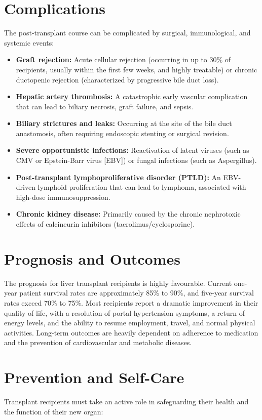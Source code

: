 \section*{Complications}
The post-transplant course can be complicated by surgical, immunological, and systemic events:

\begin{itemize}
    \item \textbf{Graft rejection:} Acute cellular rejection (occurring in up to 30\% of recipients, usually within the first few weeks, and highly treatable) or chronic ductopenic rejection (characterized by progressive bile duct loss).
    \item \textbf{Hepatic artery thrombosis:} A catastrophic early vascular complication that can lead to biliary necrosis, graft failure, and sepsis.
    \item \textbf{Biliary strictures and leaks:} Occurring at the site of the bile duct anastomosis, often requiring endoscopic stenting or surgical revision.
    \item \textbf{Severe opportunistic infections:} Reactivation of latent viruses (such as CMV or Epstein-Barr virus [EBV]) or fungal infections (such as Aspergillus).
    \item \textbf{Post-transplant lymphoproliferative disorder (PTLD):} An EBV-driven lymphoid proliferation that can lead to lymphoma, associated with high-dose immunosuppression.
    \item \textbf{Chronic kidney disease:} Primarily caused by the chronic nephrotoxic effects of calcineurin inhibitors (tacrolimus/cyclosporine).
\end{itemize}

\section*{Prognosis and Outcomes}
The prognosis for liver transplant recipients is highly favourable. Current one-year patient survival rates are approximately 85\% to 90\%, and five-year survival rates exceed 70\% to 75\%. Most recipients report a dramatic improvement in their quality of life, with a resolution of portal hypertension symptoms, a return of energy levels, and the ability to resume employment, travel, and normal physical activities. Long-term outcomes are heavily dependent on adherence to medication and the prevention of cardiovascular and metabolic diseases.

\section*{Prevention and Self-Care}
Transplant recipients must take an active role in safeguarding their health and the function of their new organ:

